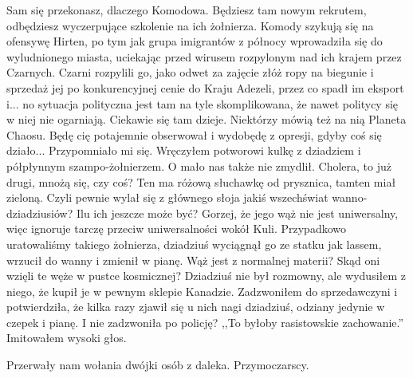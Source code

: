 \begin{dialogue}
\ds{} Sam się przekonasz, dlaczego Komodowa. Będziesz tam nowym rekrutem, odbędziesz wyczerpujące szkolenie na ich żołnierza. 
Komody szykują się na ofensywę Hirten, po tym jak grupa imigrantów z północy wprowadziła się do wyludnionego miasta, uciekając przed wirusem rozpylonym nad ich krajem przez Czarnych.
Czarni rozpylili go, jako odwet za zajęcie złóż ropy na biegunie i sprzedaż jej po konkurencyjnej cenie do Kraju Adezeli, przez co spadł im eksport i... 
no sytuacja polityczna jest tam na tyle skomplikowana, że nawet politycy się w niej nie ogarniają.
\ds{} Ciekawie się tam dzieje.
\ds{} Niektórzy mówią też na nią Planeta Chaosu. Będę cię potajemnie obserwował i wydobędę z opresji, gdyby coś się działo...
\ds{} Przypomniało mi się. \dm{} Wręczyłem potworowi kulkę z dziadziem i półpłynnym szampo-żołnierzem. \dm{} O mało nas także nie zmydlił.
\ds{} Cholera, to już drugi, mnożą się, czy coś?
\ds{} Ten ma różową słuchawkę od prysznica, tamten miał zieloną. 
\ds{} Czyli pewnie wylał się z głównego słoja jakiś wszechświat wanno-dziadziusiów? Ilu ich jeszcze może być?
\ds{} Gorzej, że jego wąż nie jest uniwersalny, więc ignoruje tarczę przeciw uniwersalności wokół Kuli.
Przypadkowo uratowaliśmy takiego żołnierza, dziadziuś wyciągnął go ze statku jak lassem, wrzucił do wanny i zmienił w pianę.
\ds{} Wąż jest z normalnej materii? Skąd oni wzięli te węże w pustce kosmicznej?
\ds{} Dziadziuś nie był rozmowny, ale wydusiłem z niego, że kupił je w pewnym sklepie Kanadzie. 
Zadzwoniłem do sprzedawczyni i potwierdziła, że kilka razy zjawił się u nich nagi dziadziuś, odziany jedynie w czepek i pianę.
\ds{} I nie zadzwoniła po policję?
\ds{} ,,To byłoby rasistowskie zachowanie.'' \dm{} Imitowałem wysoki głos.
\end{dialogue}
Przerwały nam wołania dwójki osób z daleka. Przymoczarscy. 
